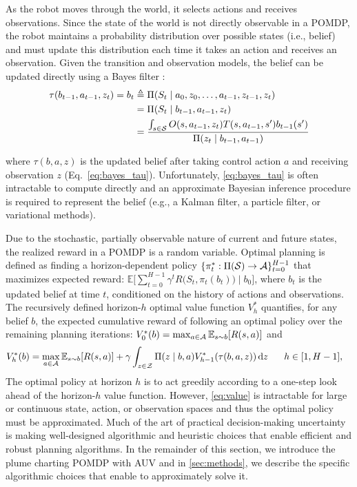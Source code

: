 As the robot moves through the world, it selects actions and receives observations. Since the state of the world is not directly observable in a POMDP, the robot maintains a probability distribution over possible states (i.e., belief) and must update this distribution each time it takes an action and receives an observation. Given the transition and observation models, the belief can be updated directly using a Bayes filter \autocite{sarkka2013bayesian}:
\begin{align}
    \tau(b_{t-1}, a_{t-1}, z_t) = b_t
        &\triangleq \Pi(S_t \mid a_0, z_0, \dots, a_{t-1}, z_{t-1}, z_t) \\
        &= \Pi(S_t \mid b_{t-1}, a_{t-1}, z_t) \\
        &= \frac{\int_{s \in \mathcal{S}} O(s, a_{t-1}, z_t) T(s, a_{t-1}, s')b_{t-1}(s')}{\Pi(z_t \mid b_{t-1}, a_{t-1})}
    \label{eq:bayes_tau}
\end{align}

where $\tau(b,a,z)$ is the updated belief after taking control action $a$ and receiving observation $z$ (Eq.~\ref{eq:bayes_tau}). Unfortunately, \cref{eq:bayes_tau} is often intractable to compute directly and an approximate Bayesian inference procedure is required to represent the belief (e.g., a Kalman filter\autocite{welch1995introduction}, a particle filter\autocite{Silver2010}, or variational methods\autocite{wainwright2002environmental,kucukelbir2017automatic}). 

Due to the stochastic, partially observable nature of current and future states, the realized reward in a POMDP is a random variable. Optimal planning is defined as finding a horizon-dependent policy $\{\pi_t^*: \Pi(\mathcal{S}) \to \mathcal{A}\}_{t=0}^{H-1}$ that maximizes expected reward: $\mathbb{E} \Big[ \sum_{t=0}^{H-1} \gamma^t R\big(S_t, \pi_t(b_t)\big) \mid b_0 \Big]$, where $b_t$ is the updated belief at time $t$, conditioned on the history of actions and observations. The recursively defined horizon-$h$ optimal value function $V^*_h$ quantifies, for any belief $b$, the expected cumulative reward of following an optimal policy over the remaining planning iterations: $V_0^{*}(b) = \operatorname*{max}_{a \in \mathcal{A}} \mathbb{E}_{s \sim b}[R(s, a)]$ and
\begin{align}
     V_h^{*}(b) &=  \max_{a \in \mathcal{A}} \mathbb{E}_{s \sim b}[R(s, a)] + \gamma \int_{z \in \mathcal{Z}} \Pi(z \mid b, a) V_{h-1}^*(\tau(b, a,z)) \, \text{d}z \hspace{0.6cm} h \in [1, H-1],
    \label{eq:value}
\end{align}
The optimal policy at horizon $h$ is to act greedily according to a one-step look ahead of the horizon-$h$ value function. However, \cref{eq:value} is intractable for large or continuous state, action, or observation spaces and thus the optimal policy must be approximated. Much of the art of practical decision-making uncertainty is making well-designed algorithmic and heuristic choices that enable efficient and robust planning algorithms. In the remainder of this section, we introduce the plume charting POMDP with AUV \Sentry and in \cref{sec:methods}, we describe the specific algorithmic choices that enable \PHORTEX to approximately solve it.  



